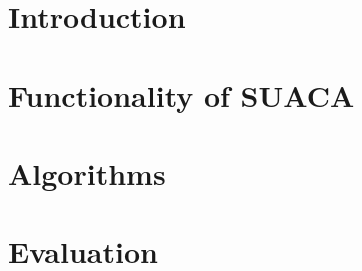\documentclass[a4paper,12pt,titlepage, twoside]{report}
\begin{document}
\setlength{\oddsidemargin}{\dimexpr (\paperwidth-\textwidth)/2 - 1in\relax}
\setlength{\evensidemargin}{\oddsidemargin}



\setcounter{page}{0}
\tableofcontents 



\chapter{Introduction}






\chapter{Functionality of SUACA}
\label{chap:functionality}








\chapter{Algorithms}
\label{chap:algorithms}




\chapter{Evaluation}
\label{chap:eval}






%
\printbibliography
\end{document}
